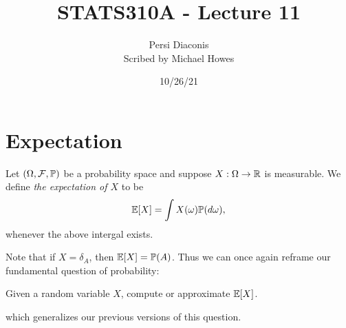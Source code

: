 




\title{STATS310A - Lecture 11}
\author{Persi Diaconis\\ Scribed by Michael Howes}
\date{10/26/21}

\pagestyle{fancy}
\fancyhf{}


\maketitle
\tableofcontents
\section{Expectation}
\begin{defn}
    Let $({{\Omega}},{\mathcal{F}},{\mathbb{P}})$ be a probability space and suppose $X: {{\Omega}} \to {\mathbb R}$ is measurable. We define \emph{the expectation of $X$} to be 
    \[ {\mathbb{E}}[X] = \int X({\omega}){\mathbb{P}}(d{\omega}),\]
    whenever the above intergal exists.
\end{defn}
Note that if $X=\delta_A$, then ${\mathbb{E}}[X] = {\mathbb{P}}(A)$. Thus we can once again reframe our fundamental question of probability:
\begin{center}
    Given a random variable $X$, compute or approximate ${\mathbb{E}}[X]$.
\end{center}
which generalizes our previous versions of this question.
